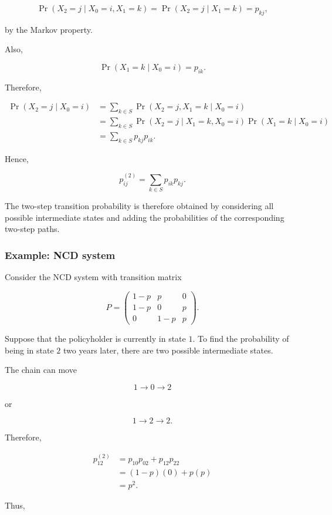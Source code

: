 \documentclass[
  letterpaper,
  DIV=11,
  numbers=noendperiod]{scrartcl}
\theoremstyle{definition}
\theoremstyle{remark}
\begin{document}
\[
\Pr(X_2=j\mid X_0=i,X_1=k)
=
\Pr(X_2=j\mid X_1=k)
=
p_{kj},
\]

by the Markov property.

Also,

\[
\Pr(X_1=k\mid X_0=i)=p_{ik}.
\]

Therefore,

\[
\begin{aligned}
\Pr(X_2=j\mid X_0=i)
&=
\sum_{k\in S}
\Pr(X_2=j,X_1=k\mid X_0=i)\\
&=
\sum_{k\in S}
\Pr(X_2=j\mid X_1=k,X_0=i)
\Pr(X_1=k\mid X_0=i)\\
&=
\sum_{k\in S}
p_{kj}p_{ik}.
\end{aligned}
\]

Hence,

\[
\boxed{
p_{ij}^{(2)}
=
\sum_{k\in S}p_{ik}p_{kj}.
}
\]

The two-step transition probability is therefore obtained by considering
all possible intermediate states and adding the probabilities of the
corresponding two-step paths.

\subsubsection{Example: NCD system}\label{example-ncd-system-1}

Consider the NCD system with transition matrix

\[
P=
\begin{pmatrix}
1-p & p & 0\\
1-p & 0 & p\\
0 & 1-p & p
\end{pmatrix}.
\]

Suppose that the policyholder is currently in state \(1\). To find the
probability of being in state \(2\) two years later, there are two
possible intermediate states.

The chain can move

\[
1\longrightarrow 0\longrightarrow 2
\]

or

\[
1\longrightarrow 2\longrightarrow 2.
\]

Therefore,

\[
\begin{aligned}
p_{12}^{(2)}
&=
p_{10}p_{02}+p_{12}p_{22}\\
&=
(1-p)(0)+p(p)\\
&=
p^2.
\end{aligned}
\]

Thus,
\end{document}
